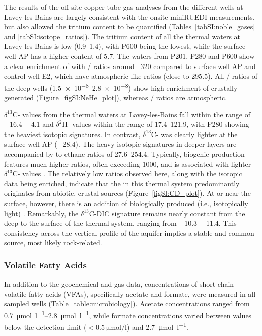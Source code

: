 The results of the off-site copper tube gas analyses from the different wells at Lavey-les-Bains are largely consistent with the onsite miniRUEDI measurements, but also allowed the tritium content to be quantified (Tables~\ref{tabSI:noble_gases} and \ref{tabSI:isotope_ratios}).
The tritium content of all the thermal waters at Lavey-les-Bains is low (\SIrange{0.9}{1.4}{\TU}), with P600 being the lowest, while the surface well AP has a higher content of \SI{5.7}{\TU}.
The waters from P201, P280 and P600 show a clear enrichment of  with / ratios around \SI{}{320} compared to surface well AP and control well E2, which have atmospheric-like ratios (close to 295.5).
All / ratios of the deep wells (\SIrange{1.5e-8}{2.8e-8}{}) show high enrichment of crustally generated  (Figure~\ref{figSI:NeHe_plot}), whereas / ratios are atmospheric.

$\delta^{13}$C- values from the thermal waters at Lavey-les-Bains fall within the range of \SIrange{-16.4}{-4.1}{\permille} and $\delta^{2}$H- values within the range of \SIrange{17.4}{121.9}{\permille}, with P280 showing the heaviest isotopic signatures.
In contrast, $\delta^{13}$C- was clearly lighter at the surface well AP (\SI{-28.4}{\permille}).
The heavy isotopic signatures in deeper layers are accompanied by  to ethane ratios of \SIrange{27.6}{254.4}{}.
Typically, biogenic  production features much higher ratios, often exceeding 1000, and is associated with lighter $\delta^{13}$C- values \citep{whiticar1999carbon, faber2015geochemical}.
The relatively low ratios observed here, along with the  isotopic data being enriched, indicate that the  in this thermal system predominantly originates from abiotic, crustal sources (Figure~\ref{figSI:CD_plot}).
At or near the surface, however, there is an addition of biologically produced (i.e., isotopically light) .
Remarkably, the $\delta^{13}$C-DIC signature remains nearly constant from the deep to the surface of the thermal system, ranging from \SIrange{-10.3}{-11.4}{\permille}.
This consistency across the vertical profile of the aquifer implies a stable and common  source, most likely rock-related.

\subsubsection{Volatile Fatty Acids}
In addition to the geochemical and gas data, concentrations of short-chain volatile fatty acids (VFAs), specifically acetate and formate, were measured in all sampled wells (Table~\ref{table:microbiology}).
Acetate concentrations ranged from \SIrange{0.7}{2.8}{\umol\per\litre}, while formate concentrations varied between values below the detection limit ($< \SI{0.5}{\umol\per\litre}$) and \SI{2.7}{\umol\per\litre}.


